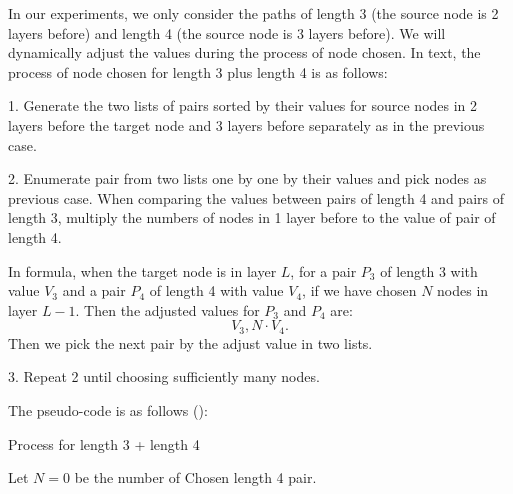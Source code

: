 \documentclass{llncs}
\begin{document}
In our experiments, we only consider the paths of length 3 (the source node is 2 layers before) and length 4 (the source node is 3 layers before). We will dynamically adjust the values during the process of node chosen. In text, the process of node chosen for length 3 plus length 4 is as follows:

\vspace*{1ex}

1. Generate the two lists of pairs sorted by their values for source nodes in 2 layers before the target node and 3 layers before separately as in the previous case.

2. Enumerate pair from two lists one by one by their values and pick nodes as previous case. When comparing the values between pairs of length 4 and pairs of length 3, multiply the numbers of nodes in 1 layer before to the value of pair of length 4.

In formula, when the target node is in layer $L$, for a pair $P_3$ of length 3 with value $V_3$ and a pair $P_4$ of length 4 with value $V_4$, if we have chosen $N$ nodes in layer $L-1$. Then the adjusted values for $P_3$ and $P_4$ are: $$V_3, N\cdot V_4.$$ Then we pick the next pair by the adjust value in two lists.

3. Repeat 2 until choosing sufficiently many nodes.

\vspace*{1ex}

The pseudo-code is as follows ():

\begin{algorithm}
	\caption{Process for length 3 + length 4}
	
	Let $N = 0$ be the number of Chosen length 4 pair.
	
\end{algorithm}
\end{document}
